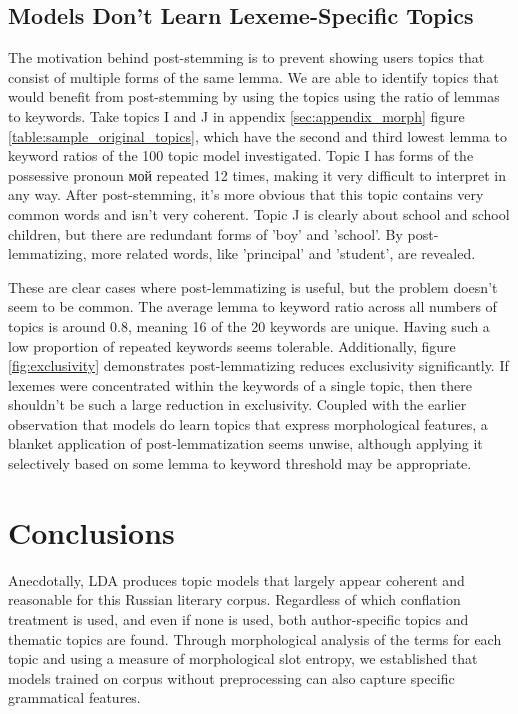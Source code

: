\documentclass[11pt,a4paper]{article}
\begin{document}
\subsection{Models Don't Learn Lexeme-Specific Topics}
The motivation behind post-stemming is to prevent showing users topics that consist of multiple forms of the same lemma. We are able to identify topics that would benefit from post-stemming by using the topics using the ratio of lemmas to keywords. Take topics I and J in appendix \ref{sec:appendix_morph} figure \ref{table:sample_original_topics}, which have the second and third lowest lemma to keyword ratios of the 100 topic model investigated. Topic I has forms of the possessive pronoun \foreignlanguage{russian}{мой} repeated 12 times, making it very difficult to interpret in any way. After post-stemming, it's more obvious that this topic contains very common words and isn't very coherent. Topic J is clearly about school and school children, but there are redundant forms of 'boy' and 'school'. By post-lemmatizing, more related words, like 'principal' and 'student', are revealed.

These are clear cases where post-lemmatizing is useful, but the problem doesn't seem to be common. The average lemma to keyword ratio across all numbers of topics is around 0.8, meaning 16 of the 20 keywords are unique. Having such a low proportion of repeated keywords seems tolerable. Additionally, figure \ref{fig:exclusivity} demonstrates post-lemmatizing reduces exclusivity significantly. If lexemes were concentrated within the keywords of a single topic, then there shouldn't be such a large reduction in exclusivity. Coupled with the earlier observation that models do learn topics that express morphological features, a blanket application of post-lemmatization seems unwise, although applying it selectively based on some lemma to keyword threshold may be appropriate.

\section{Conclusions}
Anecdotally, LDA produces topic models that largely appear coherent and reasonable for this Russian literary corpus. Regardless of which conflation treatment is used, and even if none is used, both author-specific topics and thematic topics are found. Through morphological analysis of the terms for each topic and using a measure of morphological slot entropy, we established that models trained on corpus without preprocessing can also capture specific grammatical features.
\end{document}
